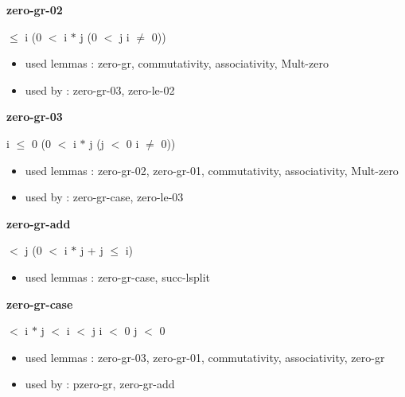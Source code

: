 \documentclass[a4paper]{article}
\begin{document}
\medskip

\bigskip

{\large\bf zero-gr-02}

\medskip

  $\le$ i \Imp (0 $<$ i $*$ j \Equiv \Not \Not (0 $<$ j \And i $\neq$ 0))

\begin{itemize}


\item       used lemmas  : zero-gr, commutativity, associativity, Mult-zero
\item       used by      : zero-gr-03, zero-le-02

\end{itemize}

\medskip

\bigskip

{\large\bf zero-gr-03}

\medskip

 \Fol i $\le$ 0 \Imp (0 $<$ i $*$ j \Equiv \Not \Not (j $<$ 0 \And i $\neq$ 0))

\begin{itemize}


\item       used lemmas  : zero-gr-02, zero-gr-01, commutativity, associativity, Mult-zero
\item       used by      : zero-gr-case, zero-le-03

\end{itemize}

\medskip

\bigskip

{\large\bf zero-gr-add}

\medskip

  $<$ j \Imp (0 $<$ i $*$ j + j  $\le$ i)

\begin{itemize}


\item       used lemmas  : zero-gr-case, succ-lsplit

\end{itemize}

\medskip

\bigskip

{\large\bf zero-gr-case}

\medskip

  $<$ i $*$ j  $<$ i  $<$ j \Or i $<$ 0 \And j $<$ 0

\begin{itemize}


\item       used lemmas  : zero-gr-03, zero-gr-01, commutativity, associativity, zero-gr
\item       used by      : pzero-gr, zero-gr-add

\end{itemize}
\end{document}
